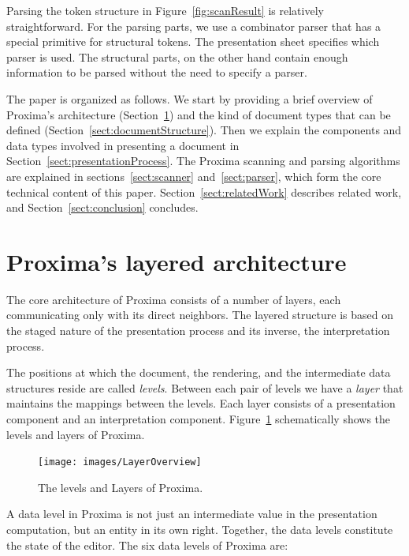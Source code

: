 \documentclass[12pt]{article}
\begin{document}
Parsing the token structure in Figure~\ref{fig:scanResult} is relatively straightforward. For the parsing parts, we use a combinator parser that has a special primitive for structural tokens. The presentation sheet specifies which parser is used. The structural parts, on the other hand contain enough information to be parsed without the need to specify a parser.

The paper is organized as follows. We start by providing a brief overview of Proxima's architecture (Section~\ref{sect:architecture}) and the kind of document types that can be defined (Section~\ref{sect:documentStructure}). Then we explain the components and data types involved in presenting a document in Section~\ref{sect:presentationProcess}. The Proxima scanning and parsing algorithms are explained in sections~\ref{sect:scanner} and~\ref{sect:parser}, which form the core technical content of this paper. Section~\ref{sect:relatedWork} describes related work, and Section~\ref{sect:conclusion} concludes.






%
\section{Proxima's layered architecture} \label{sect:architecture}
%

The core architecture of Proxima consists of a number of layers, each communicating only with its direct neighbors. The layered structure is based on the staged nature of the presentation process and its inverse, the interpretation process.

The positions at which the document, the rendering, and the intermediate data structures reside are called {\em levels}. Between each pair of levels we have a {\em layer} that maintains the mappings between the levels. Each layer consists of a presentation component and an interpretation component. Figure~\ref{fig:levelsAndLayers} schematically shows the levels and layers of Proxima. 

\begin{figure}[ht]
\centering
\texttt{[image: images/LayerOverview]}
\caption{The levels and Layers of Proxima.}
\label{fig:levelsAndLayers}
\end{figure}

A data level in Proxima is not just an intermediate value in the presentation computation, but an entity in its own right. Together, the data levels constitute the state of the editor. The six data levels of Proxima are:
\end{document}
